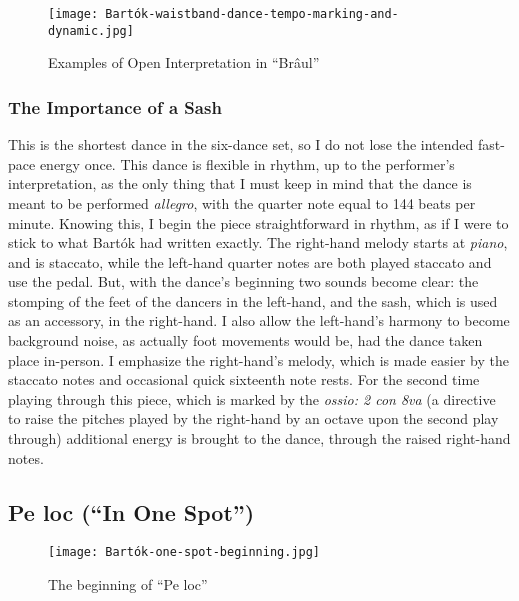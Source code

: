 \begin{figure}[h]
  \centering
  \texttt{[image: Bartók-waistband-dance-tempo-marking-and-dynamic.jpg]}
  \caption[An example of the open interpretation in ``Brâul'' of Bartók's \textit{Six Romanian Folk Dances}, Sz. 56, BB 68]{Examples of Open Interpretation in ``Brâul''}
  \label{fig:Bartók-waistband-dance-interpretation}
\end{figure}

\subsubsection{The Importance of a Sash}

This is the shortest dance in the six-dance set, so I do not lose the intended fast-pace energy once. This dance is flexible in rhythm, up to the performer's interpretation, as the only thing that I must keep in mind that the dance is meant to be performed \textit{allegro}, with the quarter note equal to 144 beats per minute. Knowing this, I begin the piece straightforward in rhythm, as if I were to stick to what Bartók had written exactly. The right-hand melody starts at \textit{piano}, and is staccato, while the left-hand quarter notes are both played staccato and use the pedal. But, with the dance's beginning two sounds become clear: the stomping of the feet of the dancers in the left-hand, and the sash, which is used as an accessory, in the right-hand. I also allow the left-hand's harmony to become background noise, as actually foot movements would be, had the dance taken place in-person. I emphasize the right-hand's melody, which is made easier by the staccato notes and occasional quick sixteenth note rests. For the second time playing through this piece, which is marked by the \textit{ossio: 2 con 8va} (a directive to raise the pitches played by the right-hand by an octave upon the second play through) additional energy is brought to the dance, through the raised right-hand notes. 


\subsection{Pe loc (``In One Spot'')}

\begin{figure}
  \centering
  \texttt{[image: Bartók-one-spot-beginning.jpg]}
  \caption[The beginning of ``Pe loc'', in Bartók's \textit{Six Romanian Folk Dances}, Sz. 56, BB 68]{The beginning of ``Pe loc''}  
  \label{fig:Bartók-one-spot-beginning}
\end{figure}

